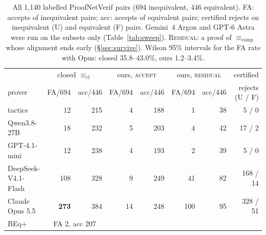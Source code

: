 \documentclass[10pt]{article}
\theoremstyle{definition}
\newcommand{\Ecl}{\mathrel{\equiv_{\mathrm{cl}}}}
\newcommand{\Ecomp}{\mathrel{\equiv_{\mathrm{comp}}}}
\newcommand{\V}[1]{\textsc{#1}}
\begin{document}
\begin{table}[t]
\centering\small
\begin{tabular}{lrrrrrrr}
\toprule
& \multicolumn{2}{c}{closed $\Ecl$} & \multicolumn{2}{c}{ours, \V{accept}} & \multicolumn{2}{c}{ours, \V{residual}} & certified\\
\cmidrule(lr){2-3}\cmidrule(lr){4-5}\cmidrule(lr){6-7}
prover & FA/694 & acc/446 & FA/694 & acc/446 & FA/694 & acc/446 & rejects (U / F)\\
\midrule
tactics & 12 & 215 & 4 & 188 & 1 & 38 & 5 / 0\\
Qwen3.8-27B & 18 & 232 & 5 & 203 & 4 & 42 & 17 / 2\\
GPT-4.1-mini & 12 & 238 & 4 & 193 & 2 & 39 & 5 / 0\\
DeepSeek-V4.1-Flash & 108 & 328 & 9 & 249 & 41 & 82 & 168 / 14\\
Claude Opus 5.5 & \textbf{273} & 384 & 14 & 248 & 100 & 95 & 328 / 51\\
\midrule
BEq+ & \multicolumn{2}{c}{FA 2, acc 207} & & & & &\\
\bottomrule
\end{tabular}
\caption{All 1,140 labelled ProofNetVerif pairs (694 inequivalent, 446 equivalent). FA: accepts of
inequivalent pairs; acc: accepts of equivalent pairs; certified rejects on inequivalent (U) and
equivalent (F) pairs. Gemini~4 Argon and GPT-6 Astra were run on the subsets only
(Table~\ref{tab:sweep}). \V{Residual}: a proof of $\Ecomp$ whose alignment ends early
(\S\ref{sec:survive}). Wilson 95\% intervals for the FA rate with Opus: closed 35.8--43.0\%, ours
1.2--3.4\%.}
\label{tab:full}
\end{table}
\end{document}
